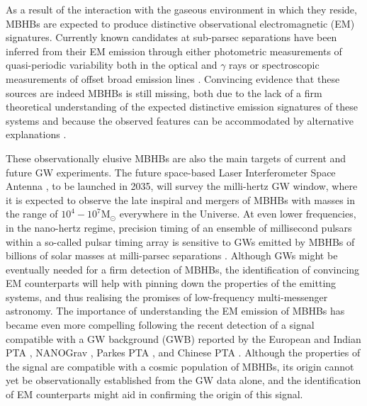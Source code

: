 \documentclass{aa}
\begin{document}
As a result of the interaction with the gaseous environment in which they reside, MBHBs are expected to produce distinctive observational electromagnetic (EM) signatures.
Currently known candidates at sub-parsec separations have been inferred from their EM emission \citep{Bogdanovic2022} through either photometric measurements of quasi-periodic variability both in the optical \citep{Graham2015,Charisi2016, Liu2019, 2020MNRAS.499.2245C} and $\gamma$ rays \citep[e.g.][]{2018A&A...615A.118S,2022arXiv221101894P} or spectroscopic measurements of offset broad emission lines \citep{Bogdanovic2009, Dotti2009,
BorosonLauer2009, TangGrindlay2009, Decarli2010, Barrows2011, Tsalmantza2011, Eracleous2012,Tsai2013}.
Convincing evidence that these sources are indeed MBHBs is still missing, both due to the lack of a firm theoretical understanding of the expected distinctive emission signatures of these systems and because the observed features can be accommodated by alternative explanations \citep[see e.g.][]{1994ApJS...90....1E,2016MNRAS.461.3145V}.

These observationally elusive MBHBs are also the main targets of current and future GW experiments. The future space-based Laser Interferometer Space Antenna  \citep[LISA,][]{LISA2023}, to be launched in 2035, will survey the milli-hertz GW window, where it is expected to observe the late inspiral and mergers of MBHBs with masses in the range of $10^4-10^7$M$_\odot$ everywhere in the Universe. At even lower frequencies, in the nano-hertz regime, precision timing of an ensemble of millisecond pulsars within a so-called pulsar timing array \citep[PTA,][]{Foster1990} is sensitive to GWs emitted by MBHBs of billions of solar masses at milli-parsec separations \citep[see e.g.][]{Sesana2008}. Although GWs might be eventually needed for a firm detection of MBHBs, the identification of convincing EM counterparts will help with pinning down the properties of the emitting systems, and thus realising the promises of low-frequency multi-messenger astronomy. The importance of understanding the EM emission of MBHBs has became even more compelling following the recent detection of a signal compatible with a GW background (GWB) reported by the European and Indian PTA \citep[EPTA+InPTA,][]{2023arXiv230616214A,2023arXiv230616224A,2023arXiv230616225A,2023arXiv230616226A,2023arXiv230616227A,Smarra2023}, NANOGrav  \citep{nanograv2023,2023ApJ...951L...8A,2023ApJ...951L...9A,2023ApJ...951L..10A,2023ApJ...951L..11A}, Parkes PTA \citep[PPTA,][]{ppta2023}, and Chinese PTA \citep[CPTA][]{cpta2023}. Although the properties of the signal are compatible with a cosmic population of MBHBs, its origin cannot yet be observationally established from the GW data alone, and the identification of EM counterparts might aid in confirming the origin of this signal.
\end{document}
